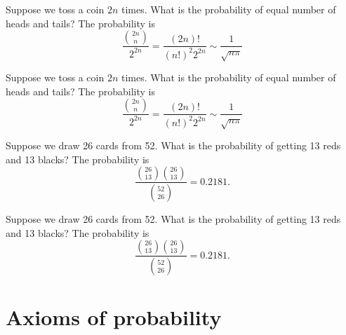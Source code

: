 \begin{note}
  \begin{field}
    \begin{eg}
      Suppose we toss a coin $2n$ times. What is the probability of equal number of heads and tails? The probability is
      \[
        \frac{\binom{2n}{n}}{2^{2n}} = \frac{(2n)!}{(n!)^2 2^{2n}} \sim \frac{1}{\sqrt{n\pi}}
      \]
    \end{eg}
  \end{field}
  \begin{field}
    \begin{eg}
      Suppose we toss a coin $2n$ times. What is the probability of equal number of heads and tails? The probability is
      \[
        \frac{\binom{2n}{n}}{2^{2n}} = \frac{(2n)!}{(n!)^2 2^{2n}} \sim \frac{1}{\sqrt{n\pi}}
      \]
    \end{eg}
  \end{field}
  \xplain{}%
\end{note}

\begin{note}
  \begin{field}
    \begin{eg}
      Suppose we draw 26 cards from 52. What is the probability of getting 13 reds and 13 blacks? The probability is
      \[
        \frac{\binom{26}{13}\binom{26}{13}}{\binom{52}{26}} = 0.2181.
      \]
    \end{eg}
  \end{field}
  \begin{field}
    \begin{eg}
      Suppose we draw 26 cards from 52. What is the probability of getting 13 reds and 13 blacks? The probability is
      \[
        \frac{\binom{26}{13}\binom{26}{13}}{\binom{52}{26}} = 0.2181.
      \]
    \end{eg}
  \end{field}
  \xplain{}%
\end{note}

\section{Axioms of probability}

